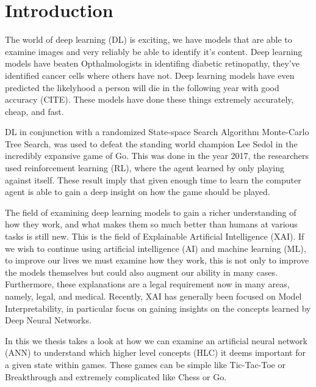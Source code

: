 \chapter{Introduction\label{cha:introduction}}


The world of deep learning (DL) is exciting, we have models that are able to examine
images and very reliably be able to identify it's content. Deep learning models have
beaten Opthalmologists in identifing diabetic retinopathy, they've identified
cancer cells where others have not. Deep learning models have even predicted
the likelyhood a person will die in the following year with good accuracy (CITE).
These models have done these things extremely accurately, cheap, and fast.

DL in conjunction with a randomized State-space Search Algorithm Monte-Carlo Tree Search, 
was used to defeat the standing world champion Lee Sedol in the incredibly expansive game of Go. This was done in the year 
2017, the researchers used reinforcement learning (RL), where the agent learned by only playing against itself. 
These result imply that given enough time to learn the computer agent is able to
gain a deep insight on how the game should be played.  

The field of examining deep learning models to gain a richer understanding
of how they work, and what makes them so much better than humans at various tasks
is still new. This is the field of Explainable Artificial Intelligence (XAI).
If we wish to continue using artificial intelligence (AI) and machine learning (ML),
to improve our lives we must examine how they work, this is not only to improve
the models themselves but could also augment our ability in many cases.
Furthermore, these explanations are a legal requirement now in many areas, namely, legal, and
medical. Recently, XAI has generally been focused on Model Interpretability, in
particular focus on gaining insights on the concepts learned by Deep Neural Networks.

In this we thesis takes a look at how we can examine an artificial neural network (ANN)
to understand which higher level concepts (HLC) it deems important for a given state
within games. These games can be simple like Tic-Tac-Toe or Breakthrough and extremely
complicated like Chess or Go. 

